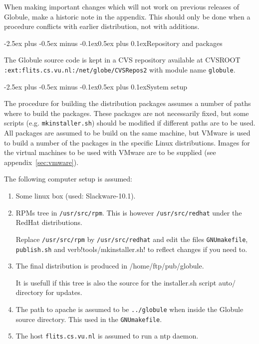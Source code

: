\documentclass[10pt,twoside]{article}
\makeatletter
\def\section{\@startsection{section}{1}
{\z@}{-2.5ex plus -0.5ex minus -0.1ex}{0.5ex plus 0.1ex}{\large\bf}}
\makeatother
\begin{document}
When making important changes which will not work on previous releases of
Globule, make a historic note in the appendix.  This should only be done when
a procedure conflicts with earlier distribution, not with additions.

\section{Repository and packages}

The Globule source code is kept in a CVS repository available at CVSROOT
\verb!:ext:flits.cs.vu.nl:/net/globe/CVSRepos2! with module name
\texttt{globule}.

\section{System setup}

The procedure for building the distribution packages assumes a number of paths
where to build the packages.  These packages are not necessarily fixed, but
some scripts (e.g. \verb!mkinstaller.sh!) should be modified if different
paths are to be used.  All packages are assumed to be build on the same
machine, but VMware is used to build a number of the packages in the specific
Linux distributions.  Images for the virtual machines to be used with VMware
are to be supplied (see appendix~\ref{sec:vmware}).

The following computer setup is assumed:
\begin{enumerate}
\item Some linux box (used: Slackware-10.1).

\item RPMs tree in \verb!/usr/src/rpm!.  This is however \verb!/usr/src/redhat!
under the %
RedHat distributions.

Replace \verb!/usr/src/rpm! by
\verb!/usr/src/redhat! and edit the files \verb!GNUmakefile!,
\verb!publish.sh! and verb!tools/mkinstaller.sh! to reflect changes if you
need to.

\item The final distribution is produced in /home/ftp/pub/globule.

It is usefull if this tree is also the source for the installer.sh script
auto/ directory for updates.

\item The path to apache is assumed to be \verb!../globule! when inside the Globule source directory. This used in the \texttt{GNUmakefile}.

\item The host \verb!flits.cs.vu.nl! is assumed to run a ntp daemon.

\end{enumerate}
\end{document}
